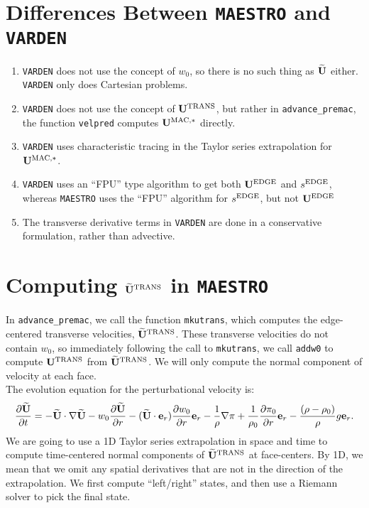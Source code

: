 \documentclass[11pt]{article}
\def\edge  {\rm EDGE}
\def\mac   {\rm MAC}
\def\trans {\rm TRANS}
\def\eb    {{\bf e}}
\def\Ub    {{\bf U}}
\def\Ubt   {\widetilde{\bf U}}
\begin{document}
\section{Differences Between {\tt MAESTRO} and {\tt VARDEN}}
\begin{enumerate}
\item {\tt VARDEN} does not use the concept of $w_0$, so there is no such thing as $\Ubt$ either.  {\tt VARDEN} only does Cartesian problems.
\item {\tt VARDEN} does not use the concept of $\Ub^{\trans}$, but rather in {\tt advance\_premac}, the function {\tt velpred} computes $\Ub^{\mac,*}$ directly.
\item {\tt VARDEN} uses characteristic tracing in the Taylor series extrapolation for $\Ub^{\mac,*}$.
\item {\tt VARDEN} uses an ``FPU'' type algorithm to get both $\Ub^{\edge}$ and $s^{\edge}$, whereas {\tt MAESTRO} uses the ``FPU'' algorithm for $s^{\edge}$, but not $\Ub^{\edge}$
\item The transverse derivative terms in {\tt VARDEN} are done in a conservative formulation, rather than advective.
\end{enumerate}
\cleardoublepage
\section{Computing $\Ubt^{\trans}$ in {\tt MAESTRO}}
In {\tt advance\_premac}, we call the function {\tt mkutrans}, which computes the edge-centered transverse velocities, $\Ubt^{\trans}$.  These transverse velocities do not contain $w_0$, so immediately following the call to {\tt mkutrans}, we call {\tt addw0} to compute $\Ub^{\trans}$ from $\Ubt^{\trans}$.  We will only compute the normal component of velocity at each face.\\

The evolution equation for the perturbational velocity is:
\begin{equation}
\frac{\partial\Ubt}{\partial t} = -\Ubt\cdot\nabla\Ubt - w_0\frac{\partial\Ubt}{\partial r} - (\Ubt\cdot\eb_r)\frac{\partial w_0}{\partial r}\eb_r - \frac{1}{\rho}\nabla\pi + \frac{1}{\rho_0}\frac{\partial\pi_0}{\partial r}\eb_r - \frac{(\rho-\rho_0)}{\rho}g\eb_r.\label{Perturbational Velocity Equation}
\end{equation}
We are going to use a 1D Taylor series extrapolation in space and time to compute time-centered normal components of $\Ubt^{\trans}$ at face-centers.  By 1D, we mean that we omit any spatial derivatives that are not in the direction of the extrapolation.  We first compute ``left/right'' states, and then use a Riemann solver to pick the final state.
\end{document}
